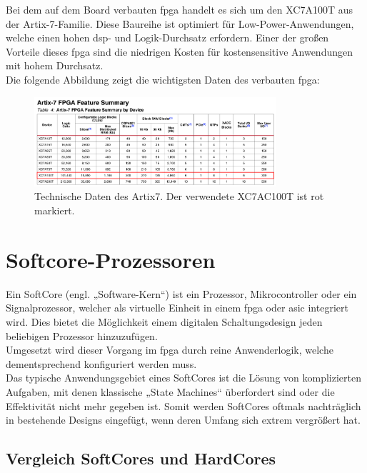 Bei dem auf dem Board verbauten \ac{fpga} handelt es sich um den  XC7A100T aus der Artix-7-Familie. Diese Baureihe ist optimiert für Low-Power-Anwendungen, welche einen hohen \ac{dsp}- und Logik-Durchsatz erfordern. Einer der großen Vorteile
dieses \ac{fpga} sind die niedrigen Kosten für kostensensitive Anwendungen mit hohem Durchsatz.\\
Die folgende Abbildung zeigt die wichtigsten Daten des verbauten \ac{fpga}:~\cite{artix7}~\cite{artix7}\\


\begin{figure}[H]
\centering
\includegraphics[width=0.8\textwidth]{Hauptteil/artix7.png}
\caption{Technische Daten des Artix7. Der verwendete XC7AC100T ist rot markiert.~\cite{artix7}}\label{fig:artix7}
\end{figure}

\section{Softcore-Prozessoren}\label{kap:softcoreprozessoren}

Ein SoftCore (engl. „Software-Kern“) ist ein Prozessor, Mikrocontroller oder ein Signalprozessor, welcher als virtuelle Einheit in einem \ac{fpga} oder \ac{asic} integriert wird.
Dies bietet die Möglichkeit einem digitalen Schaltungsdesign jeden beliebigen Prozessor hinzuzufügen.\\
Umgesetzt wird dieser Vorgang im \ac{fpga} durch reine Anwenderlogik,
welche dementsprechend konfiguriert werden muss.\\
Das typische Anwendungsgebiet eines SoftCores ist die Lösung von komplizierten Aufgaben, mit denen klassische „State Machines“ überfordert sind oder die Effektivität
 nicht mehr gegeben ist. Somit werden SoftCores oftmals nachträglich in bestehende Designs eingefügt, wenn deren Umfang sich extrem vergrößert hat.\cite{softcore}\\

\subsection{Vergleich SoftCores und HardCores}\label{kap:vergleich}


